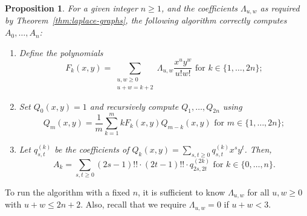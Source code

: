 \documentclass[english]{ourlematemasingle}
\numberwithin{theorem}{section}
\newtheorem{proposition}[theorem]{Proposition}
\theoremstyle{remark}
\begin{document}
\begin{proposition}\label{prop:algo}
For a given integer $n\geq 1$, and
the coefficients $\Lambda_{u,w}$ as required by Theorem~\ref{thm:laplace-graphs},
the following algorithm correctly computes $A_0,\ldots,A_n$:
\setdefaultleftmargin{0pt}{}{}{}{}{}
\begin{enumerate}
\item[\underline{Step 1}:]
Define the polynomials 
$$F_k(x,y) = 
\sum_{\substack{u,w\geq0\\u+w=k+2}} \Lambda_{u,w}\frac{x^u y^w}{u!w!} \text{ for } k \in \{1,\ldots, 2n\};
$$
\item[\underline{Step 2}:]
Set $Q_0(x,y)=1$ and recursively compute $Q_1,\ldots, Q_{2n}$ using
$$
Q_{m}(x,y) = \frac{1}{m} \sum_{k=1}^{m} k F_k(x,y) Q_{m-k}(x,y) \text{ for } m \in\{1,\ldots,2n\};
$$
\item[\underline{Step 3}:]
Let $q^{(k)}_{s,t}$ be the coefficients of $Q_{k}(x,y) = \sum_{s,t\geq 0} q^{(k)}_{s,t} x^sy^t$.
Then, 
$$
A_k = \sum_{s,t \geq 0} (2s-1)!! \cdot (2t-1)!! \cdot q^{(2k)}_{2s,2t} \text{ for } k \in \{0,\ldots,n\}.
$$
\end{enumerate}
\end{proposition}
To run the algorithm with a fixed $n$, it is sufficient to know $\Lambda_{u,w}$ for all $u,w \geq 0$ with $u+w \leq 2n+2$. Also, recall that we require $\Lambda_{u,w}=0$ if $u+w <3$.
\end{document}
